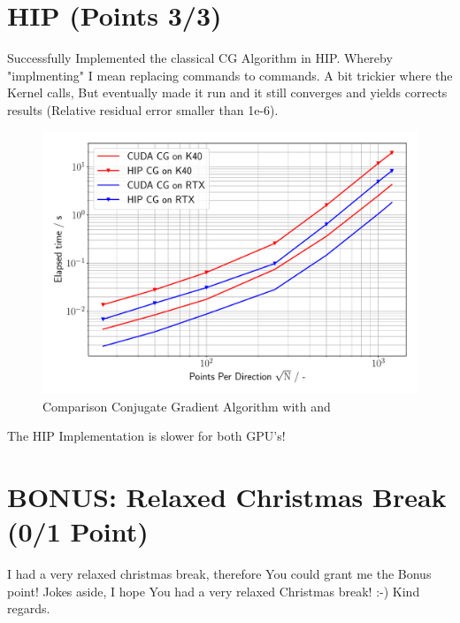 \section{HIP (Points 3/3)}
Successfully Implemented the classical CG Algorithm in HIP. Whereby "implmenting" I mean replacing  commands to  commands.
A bit trickier where the Kernel calls, But eventually made it run and it still converges and yields corrects results (Relative residual error smaller than 1e-6).

\begin{figure}[h]
    \begin{center}
        \includegraphics[width = \linewidth]{figures/task_9_2_plot.pdf}
        \caption{Comparison Conjugate Gradient Algorithm with  and }
        \end{center}
\end{figure}

The HIP Implementation is slower for both GPU's!

\section{BONUS: Relaxed Christmas Break (0/1 Point)}
I had a very relaxed christmas break, therefore You could grant me the Bonus point!
Jokes aside, I hope You had a very relaxed Christmas break! :-) Kind regards.